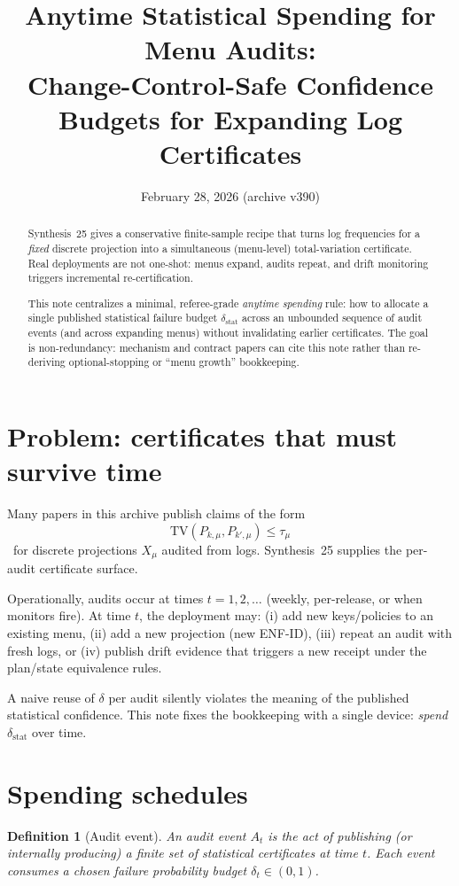 \documentclass[11pt]{article}
\title{Anytime Statistical Spending for Menu Audits:\\
\large Change-Control-Safe Confidence Budgets for Expanding Log Certificates}
\author{}
\date{February 28, 2026 (archive v390)}
\newtheorem{definition}{Definition}
\newcommand{\TV}{\mathrm{TV}}
\begin{document}
\maketitle

\begin{abstract}
Synthesis~25 gives a conservative finite-sample recipe that turns log frequencies for a \emph{fixed} discrete projection into a simultaneous (menu-level) total-variation certificate.
Real deployments are not one-shot:
menus expand, audits repeat, and drift monitoring triggers incremental re-certification.

This note centralizes a minimal, referee-grade \emph{anytime spending} rule: how to allocate a single published statistical failure budget $\delta_{\mathrm{stat}}$ across an unbounded sequence of audit events (and across expanding menus) without invalidating earlier certificates.
The goal is non-redundancy: mechanism and contract papers can cite this note rather than re-deriving optional-stopping or ``menu growth'' bookkeeping.
\end{abstract}

\section{Problem: certificates that must survive time}
Many papers in this archive publish claims of the form
\[\TV(P_{k,\mu},P_{k',\mu})\le \tau_{\mu}\]\
for discrete projections $X_\mu$ audited from logs.
Synthesis~25 supplies the per-audit certificate surface.\cite{series:stataudit}

Operationally, audits occur at times $t=1,2,\dots$ (weekly, per-release, or when monitors fire).
At time $t$, the deployment may:
(i) add new keys/policies to an existing menu,
(ii) add a new projection (new ENF-ID),
(iii) repeat an audit with fresh logs, or
(iv) publish drift evidence that triggers a new receipt under the plan/state equivalence rules.\cite{series:planstateequiv,series:accountingrulebook}

A naive reuse of $\delta$ per audit silently violates the meaning of the published statistical confidence.
This note fixes the bookkeeping with a single device: \emph{spend} $\delta_{\mathrm{stat}}$ over time.

\section{Spending schedules}
\begin{definition}[Audit event]
An \emph{audit event} $A_t$ is the act of publishing (or internally producing) a finite set of statistical certificates at time $t$.
Each event consumes a chosen failure probability budget $\delta_t\in(0,1)$.
\end{definition}
\end{document}
